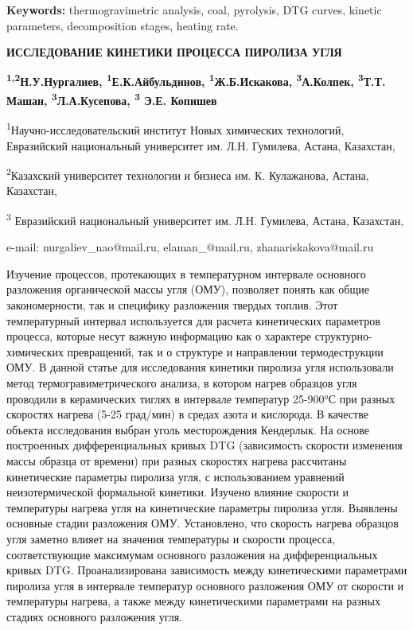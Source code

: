 {\bfseries Keywords:} thermogravimetric analysis, coal, pyrolysis, DTG
curves, kinetic parameters, decomposition stages, heating rate.

\begin{center}
{\large\bfseries ИССЛЕДОВАНИЕ КИНЕТИКИ ПРОЦЕССА ПИРОЛИЗА УГЛЯ}

{\bfseries \textsuperscript{1,2}Н.У.Нургалиев, \textsuperscript{1}Е.К.Айбульдинов, \textsuperscript{1}Ж.Б.Искакова, \textsuperscript{3}А.Колпек, \textsuperscript{3}Т.Т. Машан, \textsuperscript{3}Л.А.Кусепова, \textsuperscript{3} Э.Е. Копишев}

\textsuperscript{1}Научно-исследовательский институт Новых химических
технологий, Евразийский национальный университет им. Л.Н. Гумилева,
Астана, Казахстан,

\textsuperscript{2}Казахский университет технологии и бизнеса им. К.
Кулажанова, Астана, Казахстан,

\textsuperscript{3} Евразийский национальный университет им. Л.Н.
Гумилева, Астана, Казахстан,

e-mail: nurgaliev\_nao@mail.ru, elaman\_@mail.ru, zhanariskakova@mail.ru
\end{center}

Изучение процессов, протекающих в температурном интервале основного
разложения органической массы угля (ОМУ), позволяет понять как общие
закономерности, так и специфику разложения твердых топлив. Этот
температурный интервал используется для расчета кинетических параметров
процесса, которые несут важную информацию как о характере
структурно-химических превращений, так и о структуре и направлении
термодеструкции ОМУ. В данной статье для исследования кинетики пиролиза
угля использовали метод термогравиметрического анализа, в котором нагрев
образцов угля проводили в керамических тиглях в интервале температур
25-900°С при разных скоростях нагрева (5-25 град/мин) в средах азота и
кислорода. В качестве объекта исследования выбран уголь месторождения
Кендерлык. На основе построенных дифференциальных кривых DTG
(зависимость скорости изменения массы образца от времени) при разных
скоростях нагрева рассчитаны кинетические параметры пиролиза угля, с
использованием уравнений неизотермической формальной кинетики. Изучено
влияние скорости и температуры нагрева угля на кинетические параметры
пиролиза угля. Выявлены основные стадии разложения ОМУ. Установлено, что
скорость нагрева образцов угля заметно влияет на значения температуры и
скорости процесса, соответствующие максимумам основного разложения на
дифференциальных кривых DTG. Проанализирована зависимость между
кинетическими параметрами пиролиза угля в интервале температур основного
разложения ОМУ от скорости и температуры нагрева, а также между
кинетическими параметрами на разных стадиях основного разложения угля.

